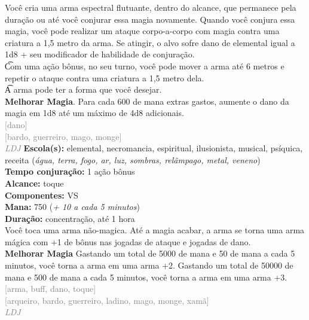 \documentclass{RPG_Adventure}[2021/10/20]
\begin{document}
{\normalsize Você cria uma arma espectral flutuante, dentro do alcance, que permanece pela duração ou até você conjurar essa magia novamente. Quando você conjura essa magia, você pode realizar um ataque corpo-a-corpo com magia contra uma criatura a 1,5 metro da arma. Se atingir, o alvo sofre dano de elemental igual a 1d8 + seu modificador de habilidade de conjuração.\\\t Com uma ação bônus, no seu turno, você pode mover a arma até 6 metros e repetir o ataque contra uma criatura a 1,5 metro dela.\\\t A arma pode ter a forma que você desejar.\\\t \textbf{Melhorar Magia}. Para cada 600 de mana extras gastos, aumente o dano da magia em 1d8 até um máximo de 4d8 adicionais.\\}
{\scriptsize \textcolor{gray}{[dano]\\}}
{\scriptsize \textcolor{gray}{[bardo, guerreiro, mago, monge]\\}}
{\tiny \textcolor{gray}{\textit{LDJ}}}\jump{}
{\small \t \textbf{Escola(s):} elemental, necromancia, espiritual, ilusionista, musical, psíquica, receita (\textit{água, terra, fogo, ar, luz, sombras, relâmpago, metal, veneno})\\\t \textbf{Tempo conjuração:} 1 ação bônus\\\t \textbf{Alcance:} toque\\\t \textbf{Componentes:} VS\\\t \textbf{Mana:} 750 (\textit{+ 10 a cada 5 minutos})\\\t \textbf{Duração:} concentração, até 1 hora\\}
{\normalsize Você toca uma arma não-magica. Até a magia acabar, a arma se torna uma arma mágica com +1 de bônus nas jogadas de ataque e jogadas de dano.\\\t \textbf{Melhorar Magia} Gastando um total de 5000 de mana e 50 de mana a cada 5 minutos, você torna a arma em uma arma +2. Gastando um total de 50000 de mana e 500 de mana a cada 5 minutos, você torna a arma em uma arma +3.\\}
{\scriptsize \textcolor{gray}{[arma, buff, dano, toque]\\}}
{\scriptsize \textcolor{gray}{[arqueiro, bardo, guerreiro, ladino, mago, monge, xamã]\\}}
{\tiny \textcolor{gray}{\textit{LDJ}}}\jump{}
\end{document}
